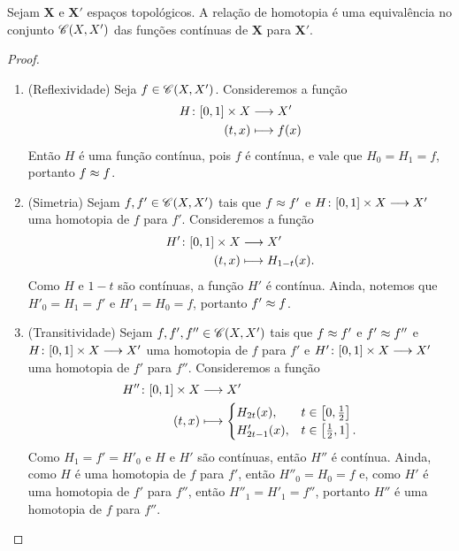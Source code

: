 \begin{proposition}
Sejam $\bm X$ e $\bm X'$ espaços topológicos. A relação de homotopia é uma equivalência no conjunto $\mathscr{C}(X,X')$ das funções contínuas de $\bm X$ para $\bm X'$.
\end{proposition}
\begin{proof}
	\begin{enumerate}
	\item (Reflexividade) Seja $f \in \mathscr{C}(X,X')$. Consideremos a função
		\begin{align*}
		{H}\colon {\left[{0},{1}\right] \times X} &\longrightarrow {X'} \\{(t,x)} &\longmapsto f(x)
		\end{align*}
Então $H$ é uma função contínua, pois $f$ é contínua, e vale que $H_0 = H_1 = f$, portanto $f \approx f$.
	
	\item (Simetria) Sejam $f,f' \in \mathscr{C}(X,X')$ tais que $f \approx f'$ e ${H}\colon {\left[{0},{1}\right] \times X} \longrightarrow {X'}$ uma homotopia de $f$ para $f'$. Consideremos a função
		\begin{align*}
		{H'}\colon {\left[{0},{1}\right] \times X} &\longrightarrow {X'} \\{(t,x)} &\longmapsto H_{1-t}(x).
		\end{align*}
Como $H$ e $1-t$ são contínuas, a função $H'$ é contínua. Ainda, notemos que $H'_0= H_1 = f'$ e $H'_1 = H_0 = f$, portanto $f' \approx f$.

	\item (Transitividade) Sejam $f,f',f'' \in \mathscr{C}(X,X')$ tais que $f \approx f'$ e $f' \approx f''$ e ${H}\colon {\left[{0},{1}\right] \times X} \longrightarrow {X'}$ uma homotopia de $f$ para $f'$ e ${H'}\colon {\left[{0},{1}\right] \times X} \longrightarrow {X'}$ uma homotopia de $f'$ para $f''$. Consideremos a função
		\begin{align*}
		\func{H''}{\intff{0}{1} \times X}{X'}{(t,x)}{
			\begin{cases}
				H_{2t}(x),& t \in \intff{0}{\frac{1}{2}} \\
				H'_{2t-1}(x),& t \in \intff{\frac{1}{2}}{1}.
			\end{cases}
		}
		\end{align*}
Como $H_1 = f' = H'_0$ e $H$ e $H'$ são contínuas, então $H''$ é contínua. Ainda, como $H$ é uma homotopia de $f$ para $f'$, então $H''_0 = H_0 = f$ e, como $H'$ é uma homotopia de $f'$ para $f''$, então $H''_1 = H'_1 = f''$, portanto $H''$ é uma homotopia de $f$ para $f''$.
	\end{enumerate}
\end{proof}

